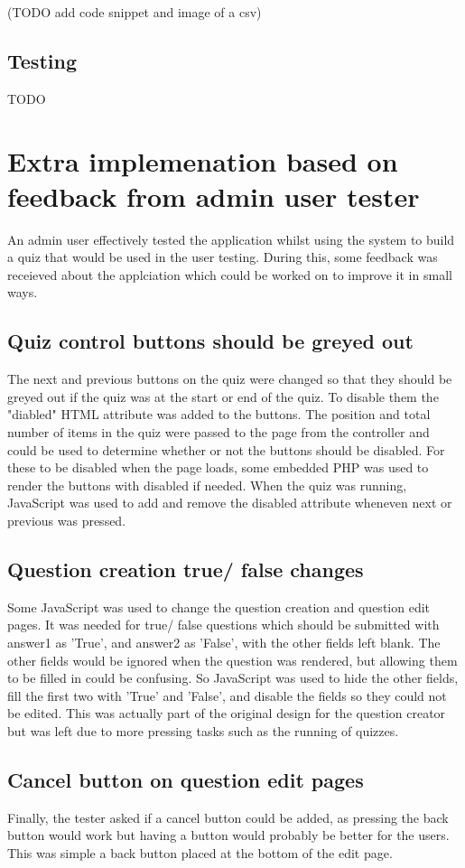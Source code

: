 \documentclass{article}
\begin{document}
(TODO add code snippet and image of a csv)
\subsection{Testing}
TODO
\newpage

\section{Extra implemenation based on feedback from admin user tester}
An admin user effectively tested the application whilst using the system to build a quiz that would be used in the user testing. During this, some feedback was receieved about the applciation which could be worked on to improve it in small ways.
\subsection{Quiz control buttons should be greyed out}
The next and previous buttons on the quiz were changed so that they should be greyed out if the quiz was at the start or end of the quiz. To disable them the "diabled" HTML attribute was added to the buttons. The position and total number of items in the quiz were passed to the page from the controller and could be used to determine whether or not the buttons should be disabled. For these to be disabled when the page loads, some embedded PHP was used to render the buttons with disabled if needed. When the quiz was running, JavaScript was used to add and remove the disabled attribute wheneven next or previous was pressed.
\subsection{Question creation true/ false changes}
Some JavaScript was used to change the question creation and question edit pages. It was needed for true/ false questions which should be submitted with answer1 as 'True', and answer2 as 'False', with the other fields left blank. The other fields would be ignored when the question was rendered, but allowing them to be filled in could be confusing. So JavaScript was used to hide the other fields, fill the first two with 'True' and 'False', and disable the fields so they could not be edited. This was actually part of the original design for the question creator but was left due to more pressing tasks such as the running of quizzes.
\subsection{Cancel button on question edit pages}
Finally, the tester asked if a cancel button could be added, as pressing the back button would work but having a button would probably be better for the users. This was simple a back button placed at the bottom of the edit page.
\end{document}
